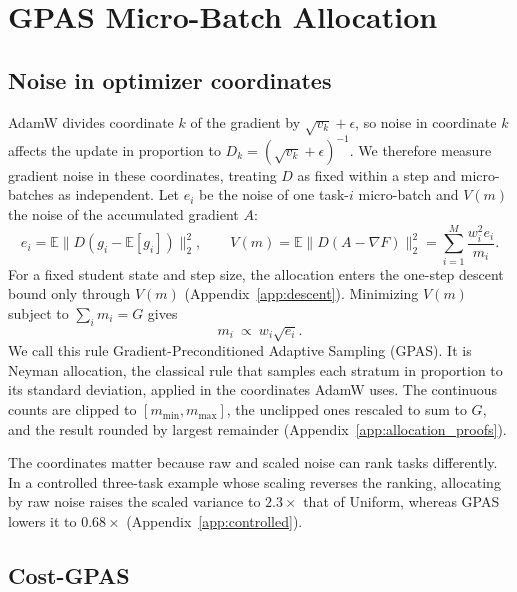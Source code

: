 \section{GPAS Micro-Batch Allocation}
\label{sec:theory}

\subsection{Noise in optimizer coordinates}

AdamW divides coordinate $k$ of the gradient by $\sqrt{v_k}+\epsilon$, so
noise in coordinate $k$ affects the update in proportion to
$D_k=(\sqrt{v_k}+\epsilon)^{-1}$. We therefore measure gradient noise in these
coordinates, treating $D$ as fixed within a step and micro-batches as
independent. Let $e_i$ be the noise of one task-$i$ micro-batch and $V(m)$ the
noise of the accumulated gradient $A$:
\begin{equation}
    e_i=\mathbb E\bigl\|D(g_i-\mathbb E[g_i])\bigr\|_2^2,
    \qquad
    V(m)=\mathbb E\bigl\|D(A-\nabla F)\bigr\|_2^2
        =\sum_{i=1}^M\frac{w_i^2e_i}{m_i}.
    \label{eq:batch_variance}
\end{equation}
For a fixed student state and step size, the allocation enters the one-step
descent bound only through $V(m)$ (Appendix~\ref{app:descent}). Minimizing
$V(m)$ subject to $\sum_i m_i=G$ gives
\begin{equation}
    m_i\ \propto\ w_i\sqrt{e_i}.
    \label{eq:batch_gpas_allocation}
\end{equation}
We call this rule Gradient-Preconditioned Adaptive Sampling (GPAS). It is
Neyman allocation, the classical rule that samples each stratum in proportion
to its standard deviation, applied in the coordinates AdamW uses. The
continuous counts are clipped to $[m_{\min},m_{\max}]$, the unclipped ones
rescaled to sum to $G$, and the result rounded by largest remainder
(Appendix~\ref{app:allocation_proofs}).

The coordinates matter because raw and scaled noise can rank tasks
differently. In a controlled three-task example whose scaling reverses the
ranking, allocating by raw noise raises the scaled variance to $2.3\times$
that of Uniform, whereas GPAS lowers it to $0.68\times$
(Appendix~\ref{app:controlled}).

\subsection{Cost-GPAS}


